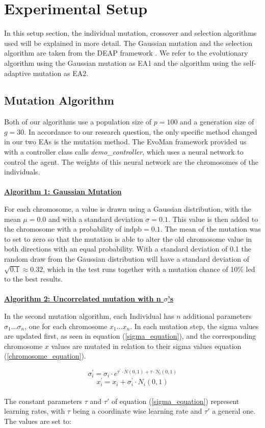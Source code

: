 \section{Experimental Setup}
In this setup section, the individual mutation, crossover and selection algorithms used will be explained in more detail. 
The Gaussian mutation and the selection algorithm are taken from the DEAP framework \cite{DEAP_JMLR2012}. We refer to the evolutionary algorithm using the Gaussian mutation as EA1 and the algorithm using the self-adaptive mutation as EA2.
\subsection{Mutation Algorithm}
Both of our algorithms use a population size of $p = 100$ and a generation size of $g = 30$. In accordance to our research question, the only specific method changed in our two EAs is the mutation method.
The EvoMan framework provided us with a controller class calls \emph{demo\_controller}, which uses a neural network to control the agent. The weights of this neural network are the chromosomes of the individuals. 
\\\\
\noindent\textbf{\underline{Algorithm 1: Gaussian Mutation}}

For each chromosome, a value is drawn using a Gaussian distribution, with the mean $\mu = 0.0$ and with a standard deviation $\sigma = 0.1$. This value is then added to the chromosome with a probability of $\text{indpb} = 0.1$. The mean of the mutation was to set to zero so that the mutation is able to alter the old chromosome value in both directions with an equal probability. With a standard deviation of 0.1 the random draw from the Gaussian distribution will have a standard deviation of $\sqrt{0.1} \approx 0.32$, which in the test runs together with a mutation chance of 10\% led to the best results.
\\\\
\textbf{\underline{Algorithm 2: Uncorrelated mutation with n $\sigma$’s}}

In the second mutation algorithm, each Individual has $n$ additional parameters $\sigma_1 \ldots \sigma_n$, one for each chromosome $x_1 \ldots x_n$. In each mutation step, the sigma values are updated first, as seen in equation (\ref{sigma_equation}), and the corresponding chromosome $x$ values are mutated in relation to their sigma values equation (\ref{chromosome_equation}).

\begin{equation}
	\label{sigma_equation}
	\sigma_{i}^{\prime} =\sigma_{i} \cdot e^{\tau^{\prime} \cdot N(0,1)+\tau \cdot N_{i}(0,1)}
\end{equation}
\begin{equation}
	\label{chromosome_equation}
	x_{i}^{\prime} =x_{i}+\sigma_{i}^{\prime} \cdot N_{i}(0,1)
\end{equation}
\\
The constant parameters $\tau$ and $\tau'$ of equation (\ref{sigma_equation}) represent learning rates, with $\tau$ being a coordinate wise learning rate and $\tau'$ a general one. The values are set to:

